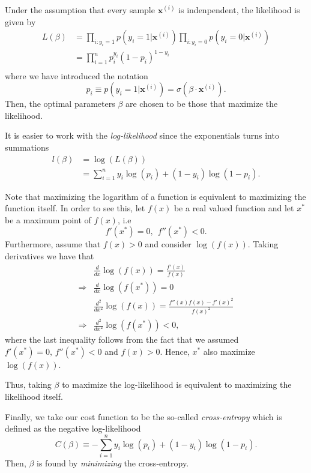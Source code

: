 \documentclass[a4paper, twocolumn]{article}
\begin{document}
Under the assumption that every sample $\mathbf{x}^{(i)}$ is indenpendent, the likelihood is given by 
\begin{align}
 L(\beta) &= \prod_{i : y_i = 1} p(y_i=1 | \mathbf{x}^{(i)}) \prod_{i : y_i = 0} p(y_i=0 | \mathbf{x}^{(i)}) \nonumber \\
 &= \prod_{i=1}^n p_i^{y_i} ( 1-p_i)^{1-y_i} \\
\end{align}
where we have introduced the notation
\begin{equation}
 p_i \equiv p(y_i=1 | \mathbf{x}^{(i)}) = \sigma(\beta \cdot \mathbf{x}^{(i)}).
\end{equation}
Then, the optimal parameters $\beta$ are chosen to be those that maximize the likelihood. 

It is easier to work with the \textit{log-likelihood} since the exponentials turns into summations
\begin{align}
 l(\beta) &= \log(L(\beta)) \nonumber \\
 &= \sum_{i=1}^n y_i \log(p_i) + (1-y_i) \log(1-p_i). 
\end{align}

Note that maximizing the logarithm of a function is equivalent to maximizing the 
function itself. In order to see this, let $f(x)$ be a
real valued function and let $x^*$ be a maximum point of $f(x)$, i.e 
\begin{equation}
 f'(x^*) = 0, \ \ f''(x^*) < 0.
\end{equation}
Furthermore, assume that $f(x) > 0$ and consider $\log(f(x))$. Taking derivatives we have that 
\begin{align}
 &\frac{d}{dx} \log (f(x)) = \frac{f'(x)}{f(x)} \\
 \Rightarrow &\frac{d}{dx} \log(f(x^*)) = 0 \\
 &\frac{d^2}{dx^2} \log(f(x)) = \frac{f''(x) f(x) - f'(x)^2}{f(x)^2} \\
 \Rightarrow &\frac{d^2}{dx^2} \log(f(x^*)) < 0, 
\end{align}
where the last inequality follows from the fact that we assumed $f'(x^*) = 0, \, f''(x^*) < 0$ and $f(x) > 0$. Hence, $x^*$
also maximize $\log(f(x))$.

Thus, taking $\beta$ to maximize the log-likelihood is equivalent to maximizing the likelihood itself. 

Finally, we take our 
cost function to be the so-called \textit{cross-entropy} which is defined as the negative log-likelihood 
\begin{equation}
 C(\beta) \equiv   -\sum_{i=1}^n y_i \log(p_i) + (1-y_i) \log(1-p_i) \label{logRegCrossEntropy}.
\end{equation}
Then, $\beta$ is found by \textit{minimizing} the cross-entropy. 
\end{document}
